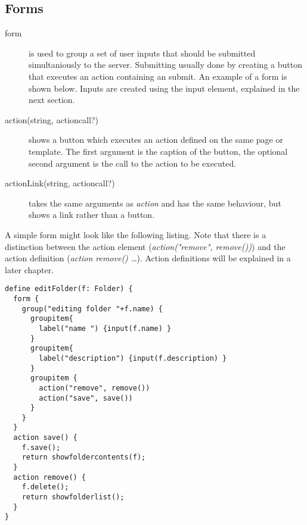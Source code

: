 \subsection{Forms}
\begin{description}
	\item[form{}] is used to group a set of user inputs that should be submitted simultaniously to the server. Submitting usually done by creating a button that executes an action containing an submit. An example of a form is shown below. Inputs are created using the input element, explained in the next section. 
	\item[action(string, actioncall?)] shows a button which executes an action defined on the same page or template. The first argument is the caption of the button, the optional second argument is the call to the action to be executed. 
	\item[actionLink(string, actioncall?)] takes the same arguments as \emph{action} and has the same behaviour, but shows a link rather than a button. 
\end{description}

A simple form might look like the following listing. Note that there is a distinction between the action element (\emph{action("remove", remove())}) and the action definition (\emph{action remove() { \ldots }}). Action definitions will be explained in a later chapter. 
\begin{lstlisting}
define editFolder(f: Folder) {
  form {
    group("editing folder "+f.name) {
      groupitem{
      	label("name ") {input(f.name) }
      }
      groupitem{
      	label("description") {input(f.description) }
      }
      groupitem {
      	action("remove", remove())
        action("save", save())
      }
    }
  }
  action save() {
    f.save();
    return showfoldercontents(f);
  }
  action remove() {
    f.delete();
    return showfolderlist();
  }
}
\end{lstlisting}

